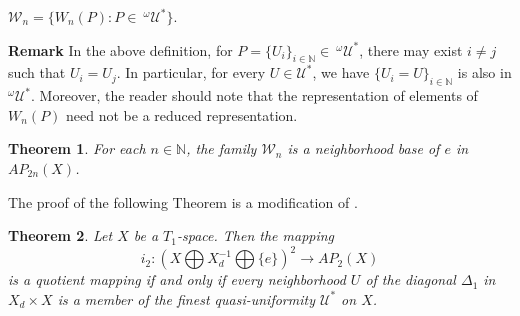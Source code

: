 \documentclass{amsart}
\newtheorem{theorem}{Theorem}[section]
\theoremstyle{definition}
\begin{document}
$\mathscr{W}_{n}=\{W_{n}(P): P\in\ ^{\omega}\mathscr{U}^{\ast}\}$.

{\bf Remark} In the above definition, for $P=\{U_{i}\}_{i\in\mathbb{N}}\in\ ^{\omega}\mathscr{U}^{\ast}$, there may exist $i\neq j$ such that $U_{i}=U_{j}$. In particular, for every $U\in\mathscr{U}^{\ast}$, we have $\{U_{i}=U\}_{i\in\mathbb{N}}$ is also in $^{\omega}\mathscr{U}^{\ast}$. Moreover, the reader should note that the representation of elements of $W_{n}(P)$ need not be a reduced representation.

\begin{theorem}\cite{LFC2012}\label{t8}
For each $n\in \mathbb{N}$, the family $\mathscr{W}_{n}$ is a neighborhood base of $e$ in $AP_{2n}(X)$.
\end{theorem}

The proof of the following Theorem is a modification of \cite[Theorem 3.10]{EN2013}.

\begin{theorem}\label{t7}
Let $X$ be a $T_{1}$-space. Then the mapping $$i_{2}: (X\bigoplus X_{d}^{-1}\bigoplus\{e\})^{2}\longrightarrow AP_{2}(X)$$ is a quotient mapping if and only if every neighborhood $U$ of the diagonal $\Delta_{1}$ in $X_{d}\times X$ is a member of the finest quasi-uniformity $\mathscr{U}^{\ast}$ on $X$.
\end{theorem}
\end{document}
